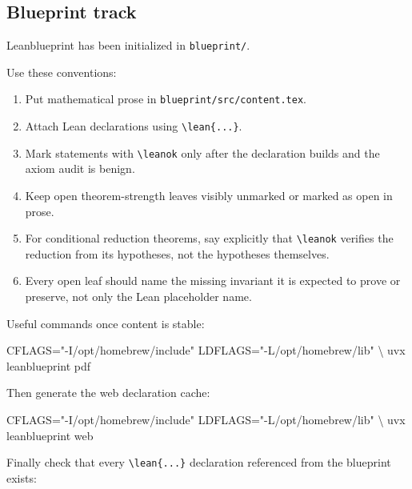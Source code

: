 \documentclass[
]{article}
\newenvironment{Shaded}{}{}
\newcommand{\NormalTok}[1]{#1}
\providecommand{\tightlist}{%
  \setlength{\itemsep}{0pt}\setlength{\parskip}{0pt}}
\begin{document}
\subsection{Blueprint track}\label{blueprint-track}

Leanblueprint has been initialized in \texttt{blueprint/}.

Use these conventions:

\begin{enumerate}
\def\labelenumi{\arabic{enumi}.}
\tightlist
\item
  Put mathematical prose in \texttt{blueprint/src/content.tex}.
\item
  Attach Lean declarations using \texttt{\textbackslash{}lean\{...\}}.
\item
  Mark statements with \texttt{\textbackslash{}leanok} only after the
  declaration builds and the axiom audit is benign.
\item
  Keep open theorem-strength leaves visibly unmarked or marked as open
  in prose.
\item
  For conditional reduction theorems, say explicitly that
  \texttt{\textbackslash{}leanok} verifies the reduction from its
  hypotheses, not the hypotheses themselves.
\item
  Every open leaf should name the missing invariant it is expected to
  prove or preserve, not only the Lean placeholder name.
\end{enumerate}

Useful commands once content is stable:

\begin{Shaded}
\begin{Highlighting}[]
\NormalTok{CFLAGS="{-}I/opt/homebrew/include" LDFLAGS="{-}L/opt/homebrew/lib" \textbackslash{}}
\NormalTok{  uvx leanblueprint pdf}
\end{Highlighting}
\end{Shaded}

Then generate the web declaration cache:

\begin{Shaded}
\begin{Highlighting}[]
\NormalTok{CFLAGS="{-}I/opt/homebrew/include" LDFLAGS="{-}L/opt/homebrew/lib" \textbackslash{}}
\NormalTok{  uvx leanblueprint web}
\end{Highlighting}
\end{Shaded}

Finally check that every \texttt{\textbackslash{}lean\{...\}}
declaration referenced from the blueprint exists:
\end{document}
